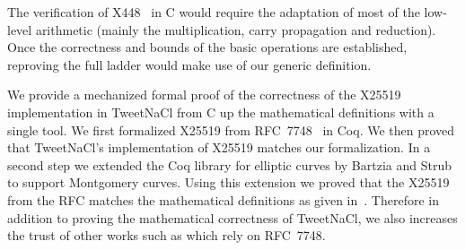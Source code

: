 The verification of \eg X448~\cite{cryptoeprint:2015:625,rfc7748} in C would
require the adaptation of most of the low-level arithmetic (mainly the
multiplication, carry propagation and reduction).
Once the correctness and bounds of the basic operations are established,
reproving the full ladder would make use of our generic definition.

We provide a mechanized formal proof of the correctness of the X25519
implementation in TweetNaCl from C up the mathematical definitions with a single tool.
We first formalized X25519 from RFC~7748~\cite{rfc7748} in Coq.
We then proved that TweetNaCl's implementation of X25519 matches our formalization.
In a second step we extended the Coq library for elliptic curves \cite{BartziaS14}
by Bartzia and Strub to support Montgomery curves.
Using this extension we proved that the X25519 from the RFC matches the
mathematical definitions as given in~\cite[Sec.~2]{Ber06}.
Therefore in addition to proving the mathematical correctness of TweetNaCl,
we also increases the trust of other works such as
\cite{zinzindohoue2017hacl,Erbsen2016SystematicSO} which rely on RFC~7748.
\vspace{-0.3cm}